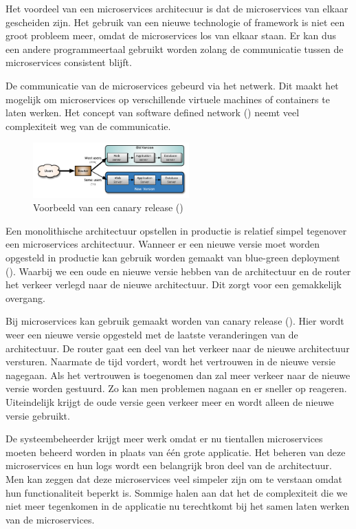 \documentclass[pdftex,a4paper,12pt,twoside]{report}
\begin{document}
Het voordeel van een microservices architecuur is dat de microservices van elkaar gescheiden zijn. Het gebruik van een nieuwe technologie of framework is niet een groot probleem meer, omdat de microservices los van elkaar staan. Er kan dus een andere programmeertaal gebruikt worden zolang de communicatie tussen de microservices consistent blijft.

De communicatie van de microservices gebeurd via het netwerk. Dit maakt het mogelijk om microservices op verschillende virtuele machines of containers te laten werken. Het concept van software defined network (\cite{garcia_villalba_trends_2015}) neemt veel complexiteit weg van de communicatie.

\begin{figure}
    \centering
    \includegraphics[width=6cm]{img/canary-release}
    \caption{Voorbeeld van een canary release (\cite{danilo_sato_canaryrelease_2014})}
    \label{fig:canary-release}
\end{figure}

Een monolithische architectuur opstellen in productie is relatief simpel tegenover een microservices architectuur. Wanneer er een nieuwe versie moet worden opgesteld in productie kan gebruik worden gemaakt van blue-green deployment (\cite{martin_fowler_bluegreendeployment_2016}). Waarbij we een oude en nieuwe versie hebben van de architectuur en de router het verkeer verlegd naar de nieuwe architectuur. Dit zorgt voor een gemakkelijk overgang.

Bij microservices kan gebruik gemaakt worden van canary release (\cite{danilo_sato_canaryrelease_2014}). Hier wordt weer een nieuwe versie opgesteld met de laatste veranderingen van de architectuur. De router gaat een deel van het verkeer naar de nieuwe architectuur versturen. Naarmate de tijd vordert, wordt het vertrouwen in de nieuwe versie nagegaan. Als het vertrouwen is toegenomen dan zal meer verkeer naar de nieuwe versie worden gestuurd. Zo kan men problemen nagaan en er sneller op reageren. Uiteindelijk krijgt de oude versie geen verkeer meer en wordt alleen de nieuwe versie gebruikt.

De systeembeheerder krijgt meer werk omdat er nu tientallen microservices moeten beheerd worden in plaats van één grote applicatie. Het beheren van deze microservices en hun logs wordt een belangrijk bron deel van de architectuur. Men kan zeggen dat deze microservices veel simpeler zijn om te verstaan omdat hun functionaliteit beperkt is. Sommige halen aan dat het de complexiteit die we niet meer tegenkomen in de applicatie nu terechtkomt bij het samen laten werken van de microservices.
\end{document}

